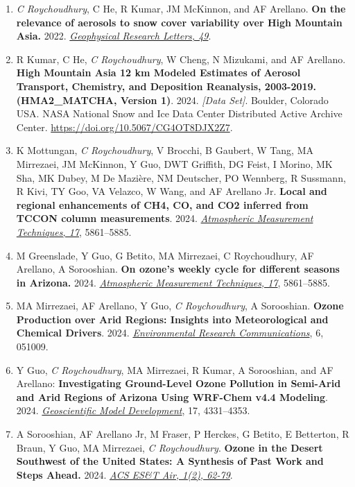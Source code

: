 \documentclass[margin,line]{resume}
\begin{document}
\begin{resume}
\begin{enumerate}[topsep=1pt, partopsep=1pt, itemsep=0.5pt, parsep=0.1pt, leftmargin=15pt,label=\arabic*.]
			\item \textit{C Roychoudhury}, C He, R Kumar, JM McKinnon, and AF Arellano. \textbf{On the relevance of aerosols to snow cover variability over High Mountain Asia.} 2022.  \href{https://doi.org/10.1029/2022GL099317}{\textit{Geophysical Research Letters, 49}}.
			
			\item R Kumar, C He, \textit{C Roychoudhury}, W Cheng, N Mizukami, and AF Arellano. 
			 \textbf{High Mountain Asia 12 km Modeled Estimates of Aerosol Transport, Chemistry, and Deposition Reanalysis, 2003-2019. (HMA2\_MATCHA, Version 1)}. 2024. \textit{[Data Set]}. Boulder, Colorado USA. NASA National Snow and Ice Data Center Distributed Active Archive Center. \url{https://doi.org/10.5067/CG4OT8DJX2Z7}.
			
			\item K Mottungan, \textit{C Roychoudhury}, V Brocchi, B Gaubert, W Tang, MA Mirrezaei, JM McKinnon, Y Guo, DWT Griffith, DG Feist, I Morino, MK Sha, MK Dubey, M De Mazière, NM Deutscher, PO Wennberg, R Sussmann, R Kivi, TY Goo, VA Velazco, W Wang, and AF Arellano Jr. \textbf{Local and regional enhancements of CH4, CO, and CO2 inferred from TCCON column measurements}. 2024.  \href{https://doi.org/10.5194/amt-17-5861-2024}{\textit{Atmospheric Measurement Techniques, 17}}, 5861–5885.
			
			\item M Greenslade, Y Guo, G Betito, MA Mirrezaei, C Roychoudhury, AF Arellano, A Sorooshian. \textbf{On ozone's weekly cycle for different seasons in Arizona.} 2024. \href{https://doi.org/10.5194/amt-17-5861-2024}{\textit{Atmospheric Measurement Techniques, 17}}, 5861–5885.
			
			\item MA Mirrezaei, AF Arellano, Y Guo, \textit{C Roychoudhury}, A Sorooshian. \textbf{Ozone Production over Arid Regions: Insights into Meteorological and
				Chemical Drivers}. 2024.  \href{https://10.1088/2515-7620/ad484c}{\textit{Environmental Research Communications}}, 6, 051009.
			
				\item Y Guo, \textit{C Roychoudhury}, MA Mirrezaei, R Kumar, A Sorooshian, and AF Arellano: \textbf{Investigating Ground-Level Ozone Pollution in Semi-Arid and Arid Regions of Arizona Using WRF-Chem v4.4 Modeling}. 2024.
			\href{ https://doi.org/10.5194/gmd-17-4331-2024}{\textit{Geoscientific Model Development}},  17, 4331–4353.
			
			\item A Sorooshian, AF Arellano Jr, M Fraser, P Herckes, G Betito, E Betterton, R Braun, Y Guo, MA Mirrezaei, \textit{C Roychoudhury}. \textbf{Ozone in the Desert Southwest of the United States: A Synthesis of Past Work and Steps Ahead.} 2024.  \href{https://doi.org/10.1021/acsestair.3c00033}{\textit{ACS ES\&T Air, 1(2), 62-79}}.
			

\end{enumerate}
\end{resume}
\end{document}
